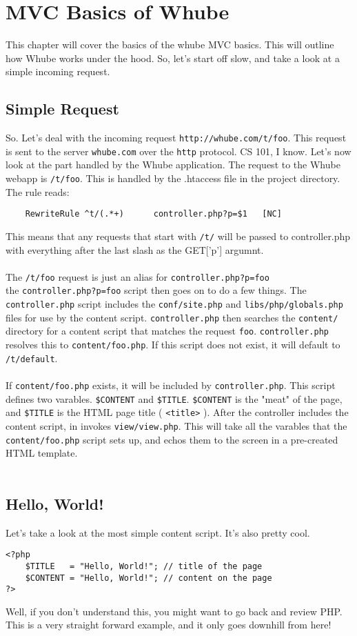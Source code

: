 \chapter {MVC Basics of Whube}
This chapter will cover the basics of the whube MVC
basics. This will outline how Whube works under the hood.
So, let's start off slow, and take a look at a simple incoming
request.
\section {Simple Request}
So. Let's deal with the incoming request \texttt{http://whube.com/t/foo}.
This request is sent to the server \texttt{whube.com} over the \texttt{http}
protocol. CS 101, I know. Let's now look at the part handled by the Whube
application. The request to the Whube webapp is \texttt{/t/foo}. This is handled
by the .htaccess file in the project directory. The rule reads:
\begin{verbatim}
    RewriteRule ^t/(.*+)      controller.php?p=$1   [NC]
\end{verbatim}
This means that any requests that start with \texttt{/t/} will be passed to controller.php
with everything after the last slash as the GET['p'] argumnt. \\
\\
The \texttt{/t/foo} request is just an alias for \texttt{controller.php?p=foo}
\\
the \texttt{controller.php?p=foo} script then goes on to do a few things. The \texttt{controller.php}
script includes the \texttt{conf/site.php} and \texttt{libs/php/globals.php} files for use by the 
content script. \texttt{controller.php} then searches the \texttt{content/} directory for a content
script that matches the request \texttt{foo}. \texttt{controller.php} resolves this to \texttt{content/foo.php}.
If this script does not exist, it will default to \texttt{/t/default}.
\\
\\
If \texttt{content/foo.php} exists, it will be included by \texttt{controller.php}.
This script defines two varables. \texttt{\$CONTENT} and \texttt{\$TITLE}.
\texttt{\$CONTENT} is the "meat" of the page, and \texttt{\$TITLE} is the HTML
page title ( \texttt{<title>} ).
After the controller includes the content script, in invokes \texttt{view/view.php}.
This will take all the varables that the \texttt{content/foo.php} script sets up, and
echos them to the screen in a pre-created HTML template.
\\
\\
\section{Hello, World!}
Let's take a look at the most simple content script. It's also pretty cool.
\begin{verbatim}
<?php
    $TITLE   = "Hello, World!"; // title of the page
    $CONTENT = "Hello, World!"; // content on the page
?>
\end{verbatim}
Well, if you don't understand this, you might want to go back and review PHP. This
is a very straight forward example, and it only goes downhill from here!
